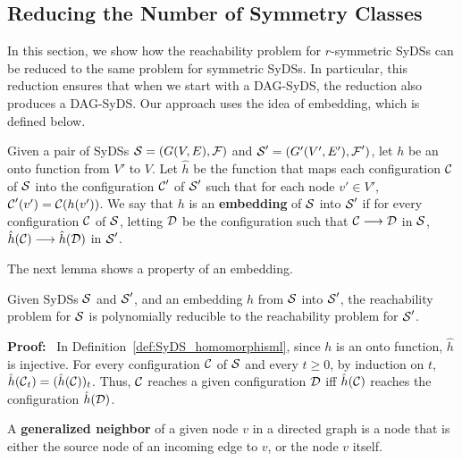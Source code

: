 \subsection{Reducing the Number of Symmetry Classes}
\label{sse:embedding}

In this section, we show how the reachability problem for
$r$-symmetric SyDSs can be reduced to the same problem for
symmetric SyDSs.
In particular, this reduction ensures that when we start
with a DAG-SyDS, the reduction also produces a DAG-SyDS.
Our approach uses the idea of embedding, which is defined below.

\begin{definition}\label{def:SyDS_homomorphisml}
Given a pair of SyDSs $\mbox{$\mathcal{S}$} = (G(V,E), \mbox{$\mathcal{F}$})$ and $\mbox{$\mathcal{S}$}' = (G'(V',E'), \mbox{$\mathcal{F}$}')$,
let $h$ be an onto function from $V'$ to $V$.
Let $\hat{h}$ be the function that maps each configuration $\mbox{$\mathcal{C}$}$ of $\mbox{$\mathcal{S}$}$
into the configuration $\mbox{$\mathcal{C}$}'$ of $\mbox{$\mathcal{S}$}'$ 
such that for each node $v' \in V'$, 
$\mbox{$\mathcal{C}$}'(v') = \mbox{$\mathcal{C}$}(h(v'))$.
We say that $h$ is an \textbf{embedding} of $\mbox{$\mathcal{S}$}$ into $\mbox{$\mathcal{S}$}'$
if for every configuration $\mbox{$\mathcal{C}$}$ of $\mbox{$\mathcal{S}$}$,
letting $\mbox{$\mathcal{D}$}$  be the configuration such that $\mbox{$\mathcal{C}$} \longrightarrow \mbox{$\mathcal{D}$}$ in $\mbox{$\mathcal{S}$}$,
$\hat{h}(\mbox{$\mathcal{C}$}) \longrightarrow \hat{h}(\mbox{$\mathcal{D}$})$ in $\mbox{$\mathcal{S}$}'$.
\end{definition}

\noindent
The next lemma shows a property of an embedding.

\begin{lemma}\label{lem:embedding_reachability}
 Given SyDSs $\mbox{$\mathcal{S}$}$ and $\mbox{$\mathcal{S}$}'$, and an embedding $h$ from $\mbox{$\mathcal{S}$}$ into  $\mbox{$\mathcal{S}$}'$,
the reachability problem for $\mbox{$\mathcal{S}$}$ is polynomially reducible
to the reachability problem for $\mbox{$\mathcal{S}$}'$.
\end{lemma}

\noindent
\textbf{Proof:}~
In Definition~\ref{def:SyDS_homomorphisml},
since $h$ is an onto function, $\hat{h}$  is injective.
For every configuration $\mbox{$\mathcal{C}$}$ of $\mbox{$\mathcal{S}$}$ and every $t \geq 0$,
by induction on $t$,
$\hat{h}(\mbox{$\mathcal{C}$}_t) = (\hat{h}(\mbox{$\mathcal{C}$}))_t $.
Thus, $\mbox{$\mathcal{C}$}$ reaches a given configuration $\mbox{$\mathcal{D}$}$
iff $\hat{h}(\mbox{$\mathcal{C}$})$ reaches the configuration $\hat{h}(\mbox{$\mathcal{D}$})$.
\QED

\begin{definition}\label{tdef:generalized_neighbor}
A {\bf generalized neighbor} of a given node $v$ in a directed graph is a node that
is either the source node of an incoming edge to $v$, or the node $v$  itself.
\end{definition}

